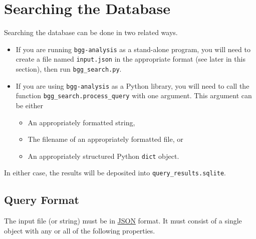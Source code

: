 \documentclass{article}
\newcommand{\code}[1]{\texttt{#1}}
\begin{document}
\section{Searching the Database}
\noindent Searching the database can be done in two related ways.
\begin{itemize}
\item If you are running \code{bgg-analysis} as a stand-alone program, you will need to create a file named \code{input.json} in the appropriate format (see later in this section), then run \code{bgg\_search.py}.
\item If you are using \code{bgg-analysis} as a Python library, you will need to call the function \code{bgg\_search.process\_query} with one argument. This argument can be either
\begin{itemize}
\item An appropriately formatted string,
\item The filename of an appropriately formatted file, or
\item An appropriately structured Python \code{dict} object.
\end{itemize}
\end{itemize}
In either case, the results will be deposited into \code{query\_results.sqlite}.

\subsection{Query Format}
\noindent The input file (or string) must be in \href{http://www.json.org/}{JSON} format. It must consist of a single object with any or all of the following properties.
\end{document}
